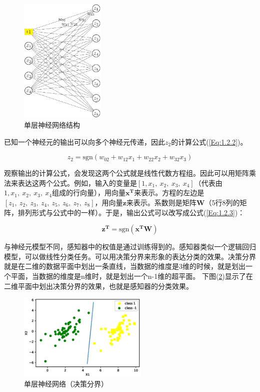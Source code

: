 \documentclass[UTF-8]{progbookcn}
\begin{document}
\begin{figure}[!ht]
  \centering
  \includegraphics[width=0.36\textwidth]{tu2F.eps}
  \caption{单层神经网络结构}\label{fig:SNN}
\end{figure}

已知一个神经元的输出可以向多个神经元传递，因此$z_2$的计算公式(\ref{Eq:1.2.2})。

\begin{equation}\label{Eq:1.2.2}
  z_2 = \text{sgn}(w_{02}+w_{12}x_1+w_{22}x_2+w_{32}x_3)
\end{equation}

观察输出的计算公式，会发现这两个公式就是线性代数方程组。因此可以用矩阵乘法来表达这两个公式。例如，输入的变量是$[1, x_1,~x_2,~x_3,~x_4]$（代表由$1, x_1,~x_2,~x_3,~x_4$组成的行向量），用向量$\bm{x^T}$来表示。方程的左边是$[z_1,~z_2,~z_3,~z_4,~z_5,~z_6,~z_7,~z_8]$，用向量$\bm{z}$来表示。系数则是矩阵$\bm{W}$（5行8列的矩阵，排列形式与公式中的一样）。于是，输出公式可以改写成公式(\ref{Eq:1.2.3})：

\begin{equation}\label{Eq:1.2.3}
 \bm{z^T} = \text{sgn}(\bm{x^T}\bm{W})
\end{equation}


与神经元模型不同，感知器中的权值是通过训练得到的。感知器类似一个逻辑回归模型，可以做线性分类任务。可以用决策分界来形象的表达分类的效果。决策分界就是在二维的数据平面中划出一条直线，当数据的维度是3维的时候，就是划出一个平面，当数据的维度是n维时，就是划出一个n-1维的超平面。
下图(\ref{fig:perceptron})显示了在二维平面中划出决策分界的效果，也就是感知器的分类效果。

\begin{figure}[!ht]
  \centering
  \includegraphics[width=0.55\textwidth]{PerceptronOrigin.eps}
  \caption{单层神经网络（决策分界）}\label{fig:perceptron}
\end{figure}
\end{document}
